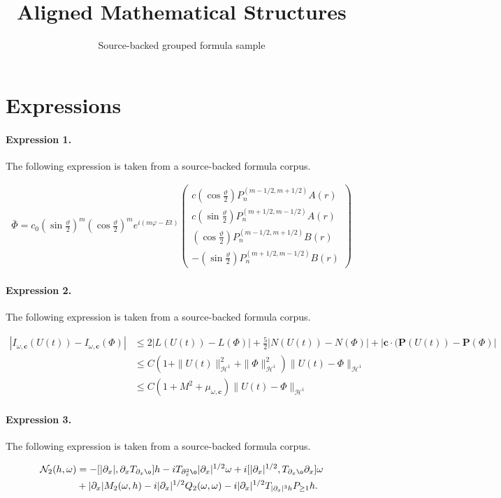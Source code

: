 \documentclass[11pt]{article}
\title{Aligned Mathematical Structures}
\author{Source-backed grouped formula sample}
\date{}
\begin{document}
\maketitle
\section{Expressions}
\paragraph{Expression 1.} The following expression is taken from a source-backed formula corpus.

\begin{align*}\bar \Phi =c_0(\sin \frac \vartheta 2)^m(\cos \frac \vartheta2)^me^{i(m\varphi -Et)}\left(\begin{array}{c}c(\cos \frac \vartheta 2)P_n^{(m-1/2,m+1/2)}A(r) \\c(\sin \frac \vartheta 2)P_n^{(m+1/2,m-1/2)}A(r) \\(\cos \frac \vartheta 2)P_n^{(m-1/2,m+1/2)}B(r) \\-(\sin \frac \vartheta 2)P_n^{(m+1/2,m-1/2)}B(r)\end{array}\right)\end{align*}

\paragraph{Expression 2.} The following expression is taken from a source-backed formula corpus.

\begin{align*}|I_{\omega,\mathbf{c}}(U(t))-I_{\omega,\mathbf{c}}(\Phi)|&\le 2|L(U(t))-L(\Phi)|+\frac{5}{2}|N(U(t))-N(\Phi)|+|\mathbf{c}\cdot (\mathbf{P}(U(t))-\mathbf{P}(\Phi)|\\&\le C(1+\|U(t)\|_{\mathcal{H}^1}^2+\|\Phi\|_{\mathcal{H}^1}^2)\|U(t)-\Phi\|_{\mathcal{H}^1}\\&\le C(1+M^2+\mu_{\omega,\mathbf{c}})\|U(t)-\Phi\|_{\mathcal{H}^1}\end{align*}

\paragraph{Expression 3.} The following expression is taken from a source-backed formula corpus.

\begin{align*}\mathcal{N}_2(h,\omega) & = - [ |\partial_x| , \partial_x T_{\partial_x \o} ] h - i T_{\partial_x^2 \o} |\partial_x|^{1/2} \omega + i [ |\partial_x|^{1/2}, T_{\partial_x \o} \partial_x] \omega\\& + |\partial_x| M_2(\omega,h) - i |\partial_x|^{1/2} Q_2(\omega,\omega) - i |\partial_x|^{1/2} T_{|\partial_x|^3 h} P_{\geq 1}h.\end{align*}
\end{document}

